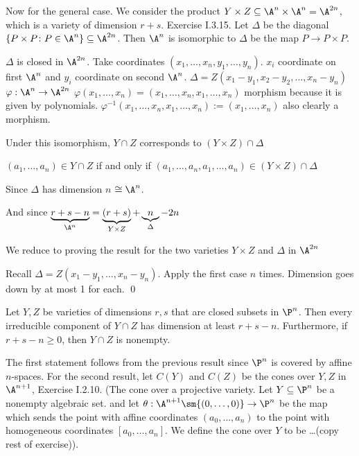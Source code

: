 Now for the general case. We consider the product $Y \times Z \subseteq \A^n \times \A^n = \A^{2n}$, which is a variety of dimension $r+s$. Exercise I.3.15. Let $\Delta$ be the diagonal $\{ P \times P \colon P \in \A^n \} \subseteq \A^{2n}$. Then $\A^n$ is isomorphic to $\Delta$ be the map $P \to P \times P$.

$\Delta$ is closed in $\A^{2n}$. Take coordinates $(x_1,\ldots,x_n,y_1,\ldots,y_n)$. $x_i$ coordinate on first $\A^n$ and $y_i$ coordinate on second $\A^n$.
$\Delta= Z(x_1 - y_1, x_2 - y_2, \ldots, x_n - y_n)$
$\varphi: \A^n \to \A^{2n}$
$\varphi(x_1,\ldots,x_n)= (x_1,\ldots,x_n,x_1,\ldots,x_n)$
morphism because it is given by polynomials. 
$\varphi^{-1}(x_1,\ldots,x_n,x_1,\ldots,x_n):= (x_1,\ldots,x_n)$ also clearly a morphism. 

Under this isomorphism, $Y \cap Z$ corresponds to $(Y \times Z) \cap \Delta$

$(a_1,\ldots,a_n) \in Y \cap Z$ if and only if $(a_1,\ldots,a_n,a_1,\ldots,a_n) \in (Y \times Z) \cap \Delta$

Since $\Delta$ has dimension $n$ $\cong \A^n$.

And since $\underbrace{r+s-n}_{\A^n}= \underbrace{(r+s)}_{Y \times Z} + \underbrace{n}_{\Delta} - 2n$

We reduce to proving the result for the two varieties $Y \times Z$ and $\Delta$ in $\A^{2n}$

Recall $\Delta= Z(x_1-y_1,\ldots,x_n-y_n)$. Apply the first case $n$ times. Dimension goes down by at most 1 for each. \qed \\


\begin{thm}
Let $Y,Z$ be varieties of dimensions $r,s$ that are closed subsets in $\P^n$. Then every irreducible component of $Y \cap Z$ has dimension at least $r + s - n$. Furthermore, if $r + s - n \geq 0$, then $Y \cap Z$ is nonempty.
\end{thm}

\pf The first statement follows from the previous result since $\P^n$ is covered by affine $n$-spaces. For the second result, let $C(Y)$ and $C(Z)$ be the cones over $Y, Z$ in $\A^{n+1}$, Exercise I.2.10. (The cone over a projective variety. Let $Y \subseteq \P^n$ be a nonempty algebraic set. and let $\theta: \A^{n+1} \sm \{(0,\ldots,0)\} \to \P^n$ be the map which sends the point with affine coordinates $(a_0,\ldots,a_n)$ to the point with homogeneous coordinates $[a_0,\ldots,a_n]$. We define the cone over $Y$ to be \dots (copy rest of exercise)). 


